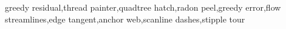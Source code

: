 greedy residual,thread painter,quadtree hatch,radon peel,greedy error,flow streamlines,edge tangent,anchor web,scanline dashes,stipple tour